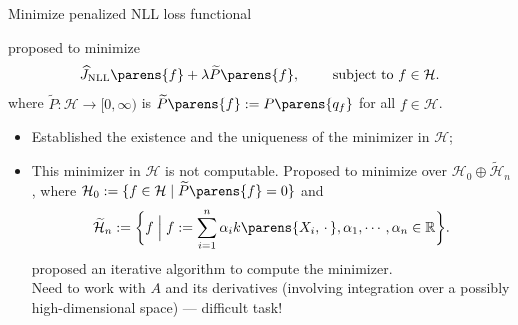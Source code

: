 \documentclass[aspectratio=169,xcolor=dvipsnames]{beamer}
\DeclareMathOperator*{\argmin}{arg\,min}
\newcommand{\NLL}{\mathrm{NLL}}
\newcommand{\calH}{\mathcal{H}}
\begin{document}
\begin{frame}{Minimize penalized NLL loss functional}
	
	
	\textcite{Gu1993-na} proposed to minimize 
	\begin{align}
		\widehat{J}_{\NLL} \parens{f} + \lambda \widetilde{P} \parens{f}, \qquad \text{ subject to } f \in \mathcal{H}. 
	\end{align}
	where $\widetilde{P}: \mathcal{H} \to [0, \infty)$ is $\widetilde{P} \parens{f} := P \parens{q_f}$ for all $f \in \mathcal{H}$. 
	
	\vspace{5pt}
	
	\begin{itemize}
		\item Established the existence and the uniqueness of the minimizer in $\mathcal{H}$; 
		\item This minimizer in $\mathcal{H}$ is {\color{red} not} computable. Proposed to minimize over $\calH_0 \oplus \widetilde{\calH}_n$, where $\calH_0 := \{ f \in \calH \mid \widetilde{P} \parens{f} = 0 \}$ and 
		\begin{align*}
			\widetilde{\mathcal{H}}_n := \bigg\{f \Bigm| f := \sum_{i=1}^n \alpha_i k \parens{X_i, \,\cdot\,}, \alpha_1, \cdots, \alpha_n \in \mathbb{R} \bigg\}. 
		\end{align*}
		\textcite{Gu1993-lf} proposed an iterative algorithm to compute the minimizer. \\ Need to work with {\color{red}$A$ and its derivatives} (involving integration over a possibly high-dimensional space)  --- {\color{red} difficult task!}
		
		 
	\end{itemize}
	
\end{frame}
\end{document}
